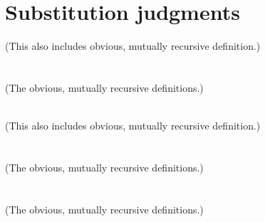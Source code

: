 \section{Substitution judgments}


(This also includes obvious, mutually recursive definition.)\\\\
\\

(The obvious, mutually recursive definitions.)\\\\

(This also includes obvious, mutually recursive definition.)\\\\
\\

(The obvious, mutually recursive definitions.)\\\\
\\

(The obvious, mutually recursive definitions.)\\\\
\\
\\
\\

